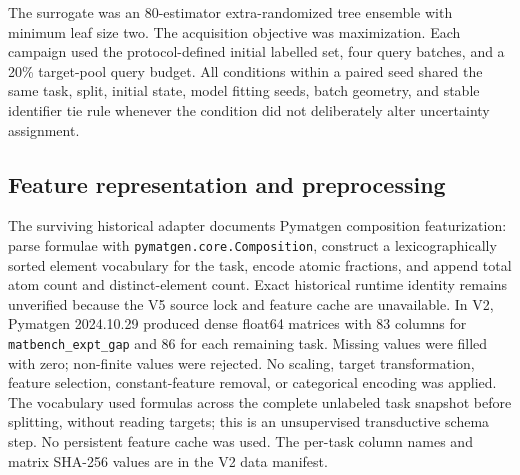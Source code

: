 \documentclass[11pt]{article}
\newcommand{\code}[1]{\texttt{#1}}
\begin{document}
The surrogate was an 80-estimator extra-randomized tree ensemble with minimum leaf size two. The acquisition objective was maximization. Each campaign used the protocol-defined initial labelled set, four query batches, and a 20\% target-pool query budget. All conditions within a paired seed shared the same task, split, initial state, model fitting seeds, batch geometry, and stable identifier tie rule whenever the condition did not deliberately alter uncertainty assignment.

\subsection{Feature representation and preprocessing}
The surviving historical adapter documents Pymatgen composition featurization: parse formulae with \texttt{pymatgen.core.Composition}, construct a lexicographically sorted element vocabulary for the task, encode atomic fractions, and append total atom count and distinct-element count. Exact historical runtime identity remains unverified because the V5 source lock and feature cache are unavailable. In V2, Pymatgen 2024.10.29 \citep{ong2013pymatgen} produced dense float64 matrices with 83 columns for \code{matbench\_expt\_gap} and 86 for each remaining task. Missing values were filled with zero; non-finite values were rejected. No scaling, target transformation, feature selection, constant-feature removal, or categorical encoding was applied. The vocabulary used formulas across the complete unlabeled task snapshot before splitting, without reading targets; this is an unsupervised transductive schema step. No persistent feature cache was used. The per-task column names and matrix SHA-256 values are in the V2 data manifest.
\end{document}
